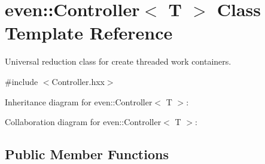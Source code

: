 \hypertarget{classeven_1_1_controller}{}\section{even\+:\+:Controller$<$ T $>$ Class Template Reference}
\label{classeven_1_1_controller}


Universal reduction class for create threaded work containers.  




{\ttfamily \#include $<$Controller.\+hxx$>$}



Inheritance diagram for even\+:\+:Controller$<$ T $>$\+:


Collaboration diagram for even\+:\+:Controller$<$ T $>$\+:
\subsection*{Public Member Functions}
